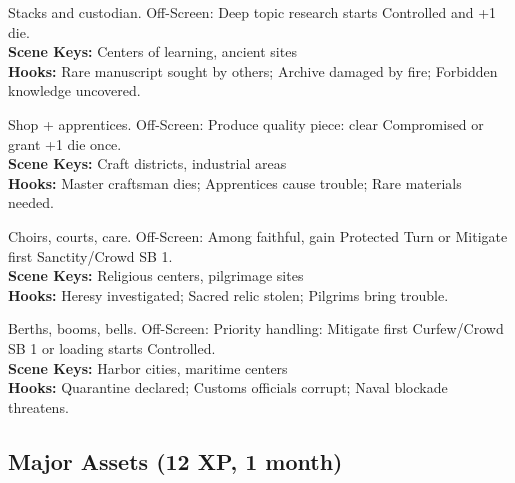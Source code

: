 \documentclass[12pt]{article}
\begin{document}
\begin{description}[leftmargin=*]
  \item[\textbf{Library Archive}] Stacks and custodian. Off-Screen: Deep topic research starts Controlled and +1 die. \\
  \textbf{Scene Keys:} Centers of learning, ancient sites \\
  \textbf{Hooks:} Rare manuscript sought by others; Archive damaged by fire; Forbidden knowledge uncovered.

  \item[\textbf{Craftsman's Quarter}] Shop + apprentices. Off-Screen: Produce quality piece: clear Compromised or grant +1 die once. \\
  \textbf{Scene Keys:} Craft districts, industrial areas \\
  \textbf{Hooks:} Master craftsman dies; Apprentices cause trouble; Rare materials needed.

  \item[\textbf{Temple Complex}] Choirs, courts, care. Off-Screen: Among faithful, gain Protected Turn or Mitigate first Sanctity/Crowd SB 1. \\
  \textbf{Scene Keys:} Religious centers, pilgrimage sites \\
  \textbf{Hooks:} Heresy investigated; Sacred relic stolen; Pilgrims bring trouble.

  \item[\textbf{Port Authority}] Berths, booms, bells. Off-Screen: Priority handling: Mitigate first Curfew/Crowd SB 1 or loading starts Controlled. \\
  \textbf{Scene Keys:} Harbor cities, maritime centers \\
  \textbf{Hooks:} Quarantine declared; Customs officials corrupt; Naval blockade threatens.
\end{description}

\subsection*{Major Assets (12 XP, 1 month)}
\end{document}
